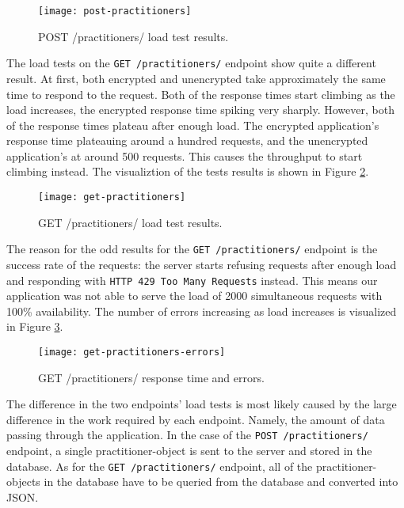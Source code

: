 \begin{figure}[!htb]
\centering
\texttt{[image: post-practitioners]}
\caption{POST /practitioners/ load test results.}
\label{fig:post-practitioners}
\end{figure}

The load tests on the \texttt{GET /practitioners/} endpoint show quite a different result.
At first, both encrypted and unencrypted take approximately the same time to respond to the request.
Both of the response times start climbing as the load increases, the encrypted response time spiking very sharply.
However, both of the response times plateau after enough load.
The encrypted application's response time plateauing around a hundred requests, and the unencrypted application's at around 500 requests.
This causes the throughput to start climbing instead.
The visualiztion of the tests results is shown in Figure \ref{fig:get-practitioners}.

\begin{figure}[!htb]
\centering
\texttt{[image: get-practitioners]}
\caption{GET /practitioners/ load test results.}
\label{fig:get-practitioners}
\end{figure}

The reason for the odd results for the \texttt{GET /practitioners/} endpoint is the success rate of the requests: the server starts refusing requests after enough load and responding with \texttt{HTTP 429 Too Many Requests} instead.
This means our application was not able to serve the load of 2000 simultaneous requests with 100\% availability.
The number of errors increasing as load increases is visualized in Figure \ref{fig:get-practitioners-errors}.

\begin{figure}[!htb]
\centering
\texttt{[image: get-practitioners-errors]}
\caption{GET /practitioners/ response time and errors.}
\label{fig:get-practitioners-errors}
\end{figure}

The difference in the two endpoints' load tests is most likely caused by the large difference in the work required by each endpoint.
Namely, the amount of data passing through the application.
In the case of the \texttt{POST /practitioners/} endpoint, a single practitioner-object is sent to the server and stored in the database.
As for the \texttt{GET /practitioners/} endpoint, all of the practitioner-objects in the database have to be queried from the database and converted into JSON.

